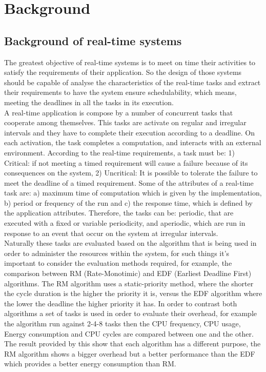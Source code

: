 \documentclass[conference]{IEEEtran}
\begin{document}
\section{Background}
\subsection{Background of real-time systems}
The greatest objective of real-time systems is to meet on time their activities to satisfy the requirements of their application. So the design of those systems should be capable of analyse the characteristics of the real-time tasks and extract their requirements to have the system ensure schedulability, which means, meeting the deadlines in all the tasks in its execution.\\
A real-time application is compose by a number of concurrent tasks that cooperate among themselves.  This tasks are activate  on regular and irregular intervals and they have to complete their execution according to a deadline. On each activation, the task completes a computation, and interacts with an external environment. According to the real-time requirements, a task must be: 1) Critical: if not meeting a timed requirement will cause a failure because of its consequences on the system, 2) Uncritical: It is possible to tolerate the failure to meet the deadline of a timed requirement. Some of the attributes of a real-time task are: a) maximum time of computation which is given by the implementation, b) period or frequency of the run and c) the response time, which is defined by the application attributes. Therefore, the tasks can be: periodic, that are executed with a fixed or variable periodicity, and aperiodic, which are run in response to an event that occur on the system at irregular intervals. \\
Naturally these tasks are evaluated based on the algorithm that is being used in order to administer the resources within the system,  for such things it's important to consider the evaluation methods required, for example, the comparison between RM (Rate-Monotimic) and EDF (Earliest Deadline First) algorithms.\cite{BECKER01} 
The RM algorithm uses a static-priority method, where the shorter the cycle duration is the higher the priority it is, versus the EDF algorithm where the lower the deadline the higher priority it has. 
In order to contrast both algorithms a set of tasks is used in order to evaluate their overhead, for example the algorithm run against 2-4-8 tasks then the CPU frequency, CPU usage, Energy consumption and CPU cycles are compared between one and the other. 
The result provided by this \cite{BECKER01} show that each algorithm has a different purpose, the RM algorithm shows a bigger overhead but a better performance than the EDF which provides a better energy consumption than RM. 
 
\end{document}
